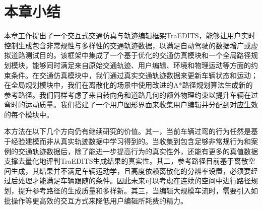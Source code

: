 \section{本章小结}


本章工作提出了一个交互式交通仿真与轨迹编辑框架TraEDITS，能够让用户实时控制生成包含非常规性与多样性的交通轨迹数据，以满足自动驾驶的数据增广或虚拟道路测试目的。该框架中集成了一个基于优化的交通仿真模块和一个全局路径规划模块，能够同时满足来自原始交通轨迹、用户编辑、环境和物理运动等方面的约束条件。在交通仿真模块中，我们通过真实交通轨迹数据来更新车辆状态和运动；在全局规划模块中，我们在离散化的场景中使用改进的A*路径规划算法生成新的参考路径。我们同样考虑了来自转向角和道路几何的额外物理约束以提升车辆在过弯时的运动质量。我们搭建了一个用户图形界面来收集用户编辑并分配到对应生效的每个模块中。

本方法在以下几个方向仍有继续研究的价值。其一，当前车辆过弯的行为任然是基于经验建模而非从真实轨迹数据中学习得到的。当收集到包含足够非常规行为和案例的交通轨迹数据后，除了能进一步提高行为的真实性外，还能有更多的真值数据支撑去量化地评判TraEDITS生成结果的真实性。其二，参考路径目前基于离散空间生成，其结果并不满足车辆运动学，且高度依赖离散化的分辨率设置，必须要经过后处理才能满足车辆跟随的条件。因此未来可以考虑在连续的空间中进行路径规划，提升参考路径的生成质量和多样新。其三，当编辑大规模车流时，需要引入如批操作等更高效的交互方式来降低用户编辑所耗费的精力。


